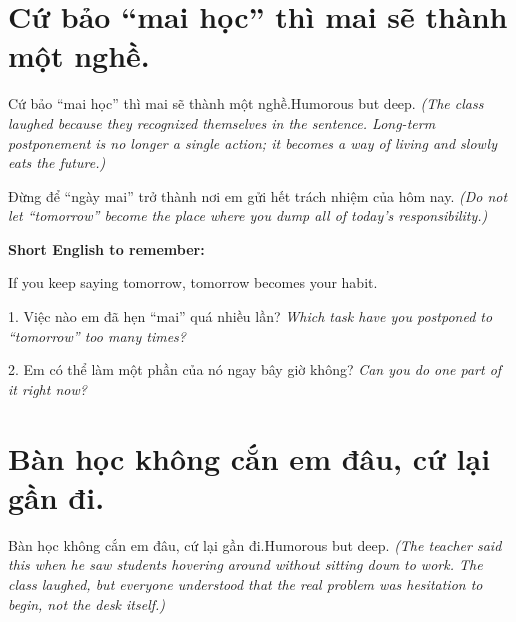 \section{Cứ bảo “mai học” thì mai sẽ thành một nghề.}
\begin{truyen}{Cứ bảo “mai học” thì mai sẽ thành một nghề.}{Humorous but deep.}
\textit{(The class laughed because they recognized themselves in the sentence. Long-term postponement is no longer a single action; it becomes a way of living and slowly eats the future.)}
\end{truyen}

\begin{baihoc}
Đừng để “ngày mai” trở thành nơi em gửi hết trách nhiệm của hôm nay.
\textit{(Do not let “tomorrow” become the place where you dump all of today's responsibility.)}
\end{baihoc}

\begin{ghinhoanh}
\textbf{Short English to remember:}

If you keep saying tomorrow, tomorrow becomes your habit.

\end{ghinhoanh}

\begin{tuhocnhanh}
1. Việc nào em đã hẹn “mai” quá nhiều lần? \textit{Which task have you postponed to “tomorrow” too many times?}

2. Em có thể làm một phần của nó ngay bây giờ không? \textit{Can you do one part of it right now?}
\end{tuhocnhanh}
\ngancach

\section{Bàn học không cắn em đâu, cứ lại gần đi.}
\begin{truyen}{Bàn học không cắn em đâu, cứ lại gần đi.}{Humorous but deep.}
\textit{(The teacher said this when he saw students hovering around without sitting down to work. The class laughed, but everyone understood that the real problem was hesitation to begin, not the desk itself.)}
\end{truyen}

